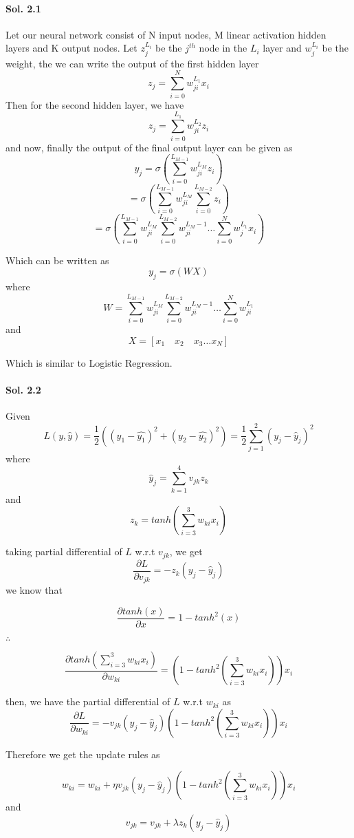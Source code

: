 \documentclass[]{report}
\begin{document}
\paragraph{Sol. 2.1}
	Let our neural network consist of N input nodes, M linear activation hidden layers and K output nodes. Let $z_j^{L_i}$ be the $j^{th}$ node in the $L_{i}$ layer and $w_j^{L_{i}}$ be the weight, the we can write the output of the first hidden layer
	\[ z_j = \sum_{i=0}^{N} w_{ji}^{L_1} x_i \]
	Then for the second hidden layer, we have
	\[ z_j = \sum_{i=0}^{L_1} w_{ji}^{L_2} z_i \]
	and now, finally the output of the final output layer can be given as 
	\[ y_j = \sigma (\sum_{i=0}^{L_{M-1}} w_{ji}^{L_M} z_i) \]
	\[ = \sigma (\sum_{i=0}^{L_{M-1}} w_{ji}^{L_M} \sum_{i=0}^{L_{M-2}} z_i) \]
	\[ = \sigma (\sum_{i=0}^{L_{M-1}} w_{ji}^{L_M} \sum_{i=0}^{L_{M-2}} w_{ji}^{L_M-1} \hdots \sum_{i=0}^{N} w_j^{L_1} x_i) \]

	Which can be written as 
	\[ y_j = \sigma (WX) \]
	where 
	\[ W = \sum_{i=0}^{L_{M-1}} w_{ji}^{L_M} \sum_{i=0}^{L_{M-2}} w_{ji}^{L_M-1} \hdots \sum_{i=0}^{N} w_{ji}^{L_1}\]
	and 
	\[ X = [x_1 \quad x_2\quad x_3 \hdots x_N ]\]

	Which is similar to Logistic Regression.

\paragraph{Sol. 2.2}
	Given 
	\[ L(y, \hat{y}) = \frac{1}{2}((y_1 - \hat{y_1})^2 + (y_2 - \hat{y_2})^2)  = \frac{1}{2} \sum_{j=1}^2 (y_j - \hat{y}_j)^2\]	
	where 
	\[ \hat{y}_j = \sum_{k=1}^{4} v_{jk} z_k\] and 
	\[ z_k = tanh(\sum_{i=3}^{3} w_{ki} x_i) \]

	taking partial differential of $L$ w.r.t $v_{jk}$, we get 
	\[ \frac{\partial{L}}{\partial{v_{jk}}} = -z_k (y_j - \hat{y}_j)\]
	we know that
	
	\[ \frac{\partial{tanh(x)}}{\partial{x}} = 1 - {tanh}^{2} (x) \]

	$\therefore$

	\[ \frac{\partial{tanh(\sum_{i=3}^{3} w_{ki} x_i)}}{\partial{w_{ki}}} = (1 - {tanh}^{2} (\sum_{i=3}^{3} w_{ki} x_i))x_i \]
	
	then, we have the partial differential of $L$ w.r.t $w_{ki}$ as 
	\[ \frac{\partial{L}}{\partial{w_{ki}}} =-v_{jk} (y_j - \hat{y}_j)(1 - {tanh}^{2} (\sum_{i=3}^{3} w_{ki} x_i))x_i \]
	
	Therefore we get the update rules as 

	\[ w_{ki} = w_{ki} + \eta v_{jk} (y_j - \hat{y}_j)(1 - {tanh}^{2} (\sum_{i=3}^{3} w_{ki} x_i))x_i\]
	and 
	\[ v_{jk} = v_{jk} + \lambda z_k (y_j - \hat{y}_j)\]
\end{document}
